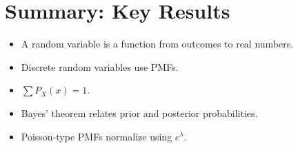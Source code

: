 \documentclass[12pt]{article}
\begin{document}
\section*{Summary: Key Results}

\begin{itemize}
    \item A random variable is a function from outcomes to real numbers.
    \item Discrete random variables use PMFs.
    \item $\sum P_X(x) = 1$.
    \item Bayes' theorem relates prior and posterior probabilities.
    \item Poisson-type PMFs normalize using $e^{\lambda}$.
\end{itemize}
\end{document}
